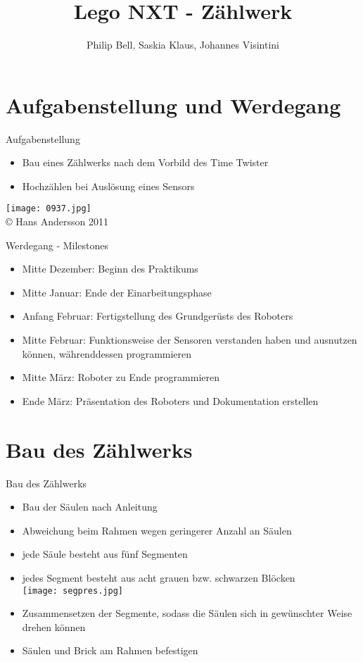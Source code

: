\documentclass{beamer}
\title{Lego NXT - Zählwerk}
\author{Philip Bell, Saskia Klaus, Johannes Visintini}
\begin{document}
\begin{frame}
\titlepage
\end{frame}

\begin{frame}
\tableofcontents
\end{frame}

\section{Aufgabenstellung und Werdegang}
\begin{frame}{Aufgabenstellung}
\begin{itemize}
	\item Bau eines Zählwerks nach dem Vorbild des Time Twister
	\item Hochzählen bei Auslösung eines Sensors
\end{itemize}
\texttt{[image: 0937.jpg]}\\
{\tiny\copyright \hspace{.3em} Hans Andersson 2011}
\end{frame}

\begin{frame}{Werdegang - Milestones}
\begin{itemize}
	\item Mitte Dezember: Beginn des Praktikums
	\item Mitte Januar: Ende der Einarbeitungsphase
	\item Anfang Februar: Fertigstellung des Grundgerüsts des Roboters
	\item Mitte Februar: Funktionsweise der Sensoren verstanden haben und ausnutzen können, währenddessen programmieren
	\item Mitte März: Roboter zu Ende programmieren
	\item Ende März: Präsentation des Roboters und Dokumentation erstellen
\end{itemize}
\end{frame}

\section{Bau des Zählwerks}
\begin{frame}{Bau des Zählwerks}
\begin{itemize}
	\item Bau der Säulen nach Anleitung
	\item Abweichung beim Rahmen wegen geringerer Anzahl an Säulen
	\item jede Säule besteht aus fünf Segmenten
	\item jedes Segment besteht aus acht grauen bzw. schwarzen Blöcken\\
	\texttt{[image: segpres.jpg]}\\
	\item<2> Zusammensetzen der Segmente, sodass die Säulen sich in gewünschter Weise drehen können
	\item<2> Säulen und Brick am Rahmen befestigen
\end{itemize}
\end{frame}
\end{document}
